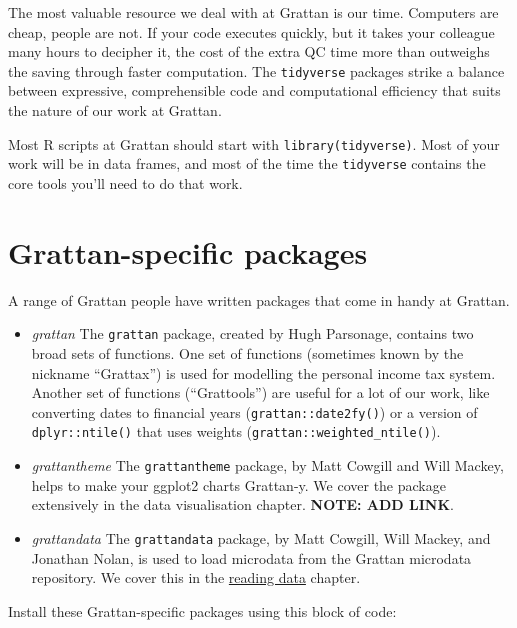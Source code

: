 \documentclass[]{book}
\begin{document}
The most valuable resource we deal with at Grattan is our time. Computers are cheap, people are not. If your code executes quickly, but it takes your colleague many hours to decipher it, the cost of the extra QC time more than outweighs the saving through faster computation. The \texttt{tidyverse} packages strike a balance between expressive, comprehensible code and computational efficiency that suits the nature of our work at Grattan.

Most R scripts at Grattan should start with \texttt{library(tidyverse)}. Most of your work will be in data frames, and most of the time the \texttt{tidyverse} contains the core tools you'll need to do that work.

\hypertarget{grattan-specific-packages}{%
\section{Grattan-specific packages}\label{grattan-specific-packages}}

A range of Grattan people have written packages that come in handy at Grattan.

\begin{itemize}
\item
  \emph{grattan} The \texttt{grattan} package, created by Hugh Parsonage, contains two broad sets of functions. One set of functions (sometimes known by the nickname ``Grattax'') is used for modelling the personal income tax system. Another set of functions (``Grattools'') are useful for a lot of our work, like converting dates to financial years (\texttt{grattan::date2fy()}) or a version of \texttt{dplyr::ntile()} that uses weights (\texttt{grattan::weighted\_ntile()}).
\item
  \emph{grattantheme} The \texttt{grattantheme} package, by Matt Cowgill and Will Mackey, helps to make your ggplot2 charts Grattan-y. We cover the package extensively in the data visualisation chapter. \textbf{NOTE: ADD LINK}.
\item
  \emph{grattandata} The \texttt{grattandata} package, by Matt Cowgill, Will Mackey, and Jonathan Nolan, is used to load microdata from the Grattan microdata repository. We cover this in the \protect\hyperlink{reading-data}{reading data} chapter.
\end{itemize}

Install these Grattan-specific packages using this block of code:
\end{document}
